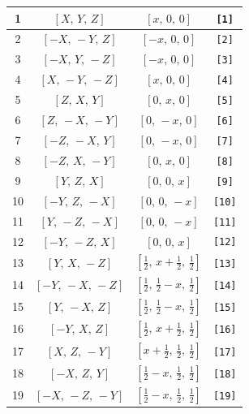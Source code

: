 \documentclass[fleqn,8pt]{jsarticle}
\begin{document}
\begin{longtable}{cccc}
1 & $\left[ X,\, Y,\, Z \right]$ & $\left[ x,\, 0,\, 0 \right]$ & {\tt [1]} \\ \hline
2 & $\left[ - X,\, - Y,\, Z \right]$ & $\left[ - x,\, 0,\, 0 \right]$ & {\tt [2]} \\ \hline
3 & $\left[ - X,\, Y,\, - Z \right]$ & $\left[ - x,\, 0,\, 0 \right]$ & {\tt [3]} \\ \hline
4 & $\left[ X,\, - Y,\, - Z \right]$ & $\left[ x,\, 0,\, 0 \right]$ & {\tt [4]} \\ \hline
5 & $\left[ Z,\, X,\, Y \right]$ & $\left[ 0,\, x,\, 0 \right]$ & {\tt [5]} \\ \hline
6 & $\left[ Z,\, - X,\, - Y \right]$ & $\left[ 0,\, - x,\, 0 \right]$ & {\tt [6]} \\ \hline
7 & $\left[ - Z,\, - X,\, Y \right]$ & $\left[ 0,\, - x,\, 0 \right]$ & {\tt [7]} \\ \hline
8 & $\left[ - Z,\, X,\, - Y \right]$ & $\left[ 0,\, x,\, 0 \right]$ & {\tt [8]} \\ \hline
9 & $\left[ Y,\, Z,\, X \right]$ & $\left[ 0,\, 0,\, x \right]$ & {\tt [9]} \\ \hline
10 & $\left[ - Y,\, Z,\, - X \right]$ & $\left[ 0,\, 0,\, - x \right]$ & {\tt [10]} \\ \hline
11 & $\left[ Y,\, - Z,\, - X \right]$ & $\left[ 0,\, 0,\, - x \right]$ & {\tt [11]} \\ \hline
12 & $\left[ - Y,\, - Z,\, X \right]$ & $\left[ 0,\, 0,\, x \right]$ & {\tt [12]} \\ \hline
13 & $\left[ Y,\, X,\, - Z \right]$ & $\left[ \frac{1}{2},\, x + \frac{1}{2},\, \frac{1}{2} \right]$ & {\tt [13]} \\ \hline
14 & $\left[ - Y,\, - X,\, - Z \right]$ & $\left[ \frac{1}{2},\, \frac{1}{2} - x,\, \frac{1}{2} \right]$ & {\tt [14]} \\ \hline
15 & $\left[ Y,\, - X,\, Z \right]$ & $\left[ \frac{1}{2},\, \frac{1}{2} - x,\, \frac{1}{2} \right]$ & {\tt [15]} \\ \hline
16 & $\left[ - Y,\, X,\, Z \right]$ & $\left[ \frac{1}{2},\, x + \frac{1}{2},\, \frac{1}{2} \right]$ & {\tt [16]} \\ \hline
17 & $\left[ X,\, Z,\, - Y \right]$ & $\left[ x + \frac{1}{2},\, \frac{1}{2},\, \frac{1}{2} \right]$ & {\tt [17]} \\ \hline
18 & $\left[ - X,\, Z,\, Y \right]$ & $\left[ \frac{1}{2} - x,\, \frac{1}{2},\, \frac{1}{2} \right]$ & {\tt [18]} \\ \hline
19 & $\left[ - X,\, - Z,\, - Y \right]$ & $\left[ \frac{1}{2} - x,\, \frac{1}{2},\, \frac{1}{2} \right]$ & {\tt [19]} \\ \hline

\end{longtable}
\end{document}
